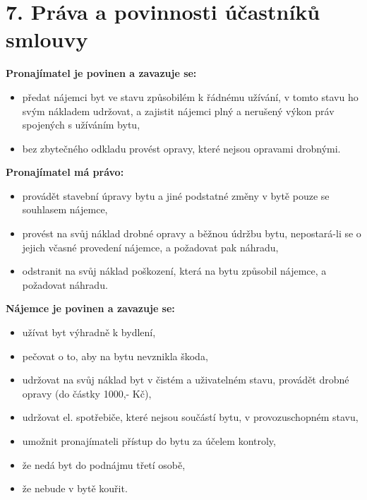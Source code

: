 \section*{7. Práva a povinnosti účastníků smlouvy}

\textbf{Pronajímatel je povinen a zavazuje se:}
\begin{itemize}
    \item předat nájemci byt ve stavu způsobilém k řádnému užívání, v tomto stavu ho svým nákladem udržovat, a zajistit nájemci plný a nerušený výkon práv spojených s užíváním bytu,
    \item bez zbytečného odkladu provést opravy, které nejsou opravami drobnými.
\end{itemize}

\textbf{Pronajímatel má právo:}
\begin{itemize}
    \item provádět stavební úpravy bytu a jiné podstatné změny v bytě pouze se souhlasem nájemce,
    \item provést na svůj náklad drobné opravy a běžnou údržbu bytu, nepostará-li se o jejich včasné provedení nájemce, a požadovat pak náhradu,
    \item odstranit na svůj náklad poškození, která na bytu způsobil nájemce, a požadovat náhradu.
\end{itemize}

\textbf{Nájemce je povinen a zavazuje se:}
\begin{itemize}
    \item užívat byt výhradně k bydlení,
    \item pečovat o to, aby na bytu nevznikla škoda,
    \item udržovat na svůj náklad byt v čistém a uživatelném stavu, provádět drobné opravy (do částky 1000,- Kč),
    \item udržovat el. spotřebiče, které nejsou součástí bytu, v provozuschopném stavu,
    \item umožnit pronajímateli přístup do bytu za účelem kontroly,
    \item že nedá byt do podnájmu třetí osobě,
    \item že nebude v bytě kouřit.
\end{itemize}
